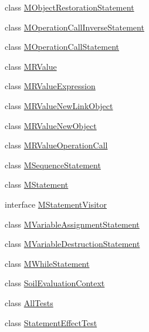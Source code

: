\begin{DoxyCompactItemize}
\item 
class \hyperlink{classorg_1_1tzi_1_1use_1_1uml_1_1sys_1_1soil_1_1_m_object_restoration_statement}{M\-Object\-Restoration\-Statement}
\item 
class \hyperlink{classorg_1_1tzi_1_1use_1_1uml_1_1sys_1_1soil_1_1_m_operation_call_inverse_statement}{M\-Operation\-Call\-Inverse\-Statement}
\item 
class \hyperlink{classorg_1_1tzi_1_1use_1_1uml_1_1sys_1_1soil_1_1_m_operation_call_statement}{M\-Operation\-Call\-Statement}
\item 
class \hyperlink{classorg_1_1tzi_1_1use_1_1uml_1_1sys_1_1soil_1_1_m_r_value}{M\-R\-Value}
\item 
class \hyperlink{classorg_1_1tzi_1_1use_1_1uml_1_1sys_1_1soil_1_1_m_r_value_expression}{M\-R\-Value\-Expression}
\item 
class \hyperlink{classorg_1_1tzi_1_1use_1_1uml_1_1sys_1_1soil_1_1_m_r_value_new_link_object}{M\-R\-Value\-New\-Link\-Object}
\item 
class \hyperlink{classorg_1_1tzi_1_1use_1_1uml_1_1sys_1_1soil_1_1_m_r_value_new_object}{M\-R\-Value\-New\-Object}
\item 
class \hyperlink{classorg_1_1tzi_1_1use_1_1uml_1_1sys_1_1soil_1_1_m_r_value_operation_call}{M\-R\-Value\-Operation\-Call}
\item 
class \hyperlink{classorg_1_1tzi_1_1use_1_1uml_1_1sys_1_1soil_1_1_m_sequence_statement}{M\-Sequence\-Statement}
\item 
class \hyperlink{classorg_1_1tzi_1_1use_1_1uml_1_1sys_1_1soil_1_1_m_statement}{M\-Statement}
\item 
interface \hyperlink{interfaceorg_1_1tzi_1_1use_1_1uml_1_1sys_1_1soil_1_1_m_statement_visitor}{M\-Statement\-Visitor}
\item 
class \hyperlink{classorg_1_1tzi_1_1use_1_1uml_1_1sys_1_1soil_1_1_m_variable_assignment_statement}{M\-Variable\-Assignment\-Statement}
\item 
class \hyperlink{classorg_1_1tzi_1_1use_1_1uml_1_1sys_1_1soil_1_1_m_variable_destruction_statement}{M\-Variable\-Destruction\-Statement}
\item 
class \hyperlink{classorg_1_1tzi_1_1use_1_1uml_1_1sys_1_1soil_1_1_m_while_statement}{M\-While\-Statement}
\item 
class \hyperlink{classorg_1_1tzi_1_1use_1_1uml_1_1sys_1_1soil_1_1_soil_evaluation_context}{Soil\-Evaluation\-Context}
\item 
class \hyperlink{classorg_1_1tzi_1_1use_1_1uml_1_1sys_1_1soil_1_1_all_tests}{All\-Tests}
\item 
class \hyperlink{classorg_1_1tzi_1_1use_1_1uml_1_1sys_1_1soil_1_1_statement_effect_test}{Statement\-Effect\-Test}
\end{DoxyCompactItemize}
